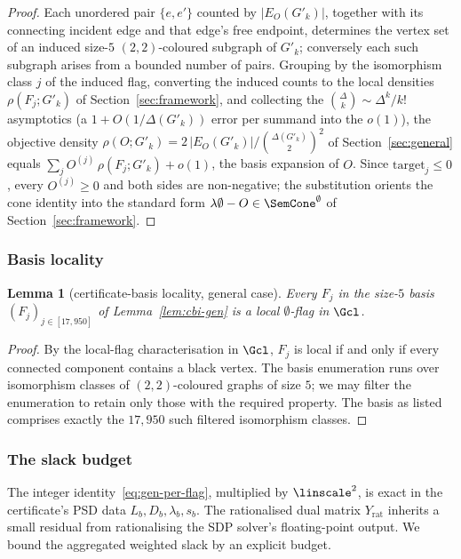\documentclass[11pt,a4paper]{article}
\newtheorem{lemma}[theorem]{Lemma}
\theoremstyle{definition}
\theoremstyle{remark}
\begin{document}
\begin{proof}
Each unordered pair $\{e, e'\}$ counted by $|E_O(G'_k)|$, together with
its connecting incident edge and that edge's free endpoint, determines
the vertex set of an induced size-$5$ $(2,2)$-coloured subgraph of
$G'_k$; conversely each such subgraph arises from a bounded number of
pairs. Grouping by the isomorphism class $j$ of the induced flag,
converting the induced counts to the local densities $\rho(F_j; G'_k)$
of Section~\ref{sec:framework}, and collecting the
$\binom{\Delta}{k} \sim \Delta^k/k!$ asymptotics (a $1 + O(1/\Delta(G'_k))$
error per summand into the $o(1)$), the objective density
$\rho(O; G'_k) = 2\,|E_O(G'_k)|/\binom{\Delta(G'_k)}{2}^2$ of
Section~\ref{sec:general} equals $\sum_j O^{(j)}\,\rho(F_j; G'_k) + o(1)$,
the basis expansion of $O$. Since $\mathrm{target}_j \leq 0$, every
$O^{(j)} \geq 0$ and both sides are non-negative; the substitution
orients the cone identity into the standard form
$\lambda\emptyset - O \in \SemCone^\emptyset$ of
Section~\ref{sec:framework}.
\end{proof}

\subsubsection{Basis locality}

\begin{lemma}[certificate-basis locality, general case]
\label{lem:basis-local-gen}
Every $F_j$ in the size-$5$ basis $(F_j)_{j \in [17{,}950]}$ of
Lemma~\ref{lem:cbi-gen} is a local $\emptyset$-flag in $\Gcl$.
\end{lemma}

\begin{proof}
By the local-flag characterisation in $\Gcl$, $F_j$ is local if and
only if every connected component contains a black vertex. The basis
enumeration runs over isomorphism classes of $(2,2)$-coloured graphs
of size $5$; we may filter the enumeration to retain only those
with the required property. The basis as listed comprises exactly
the $17{,}950$ such filtered isomorphism classes.
\end{proof}

\subsubsection{The slack budget}

The integer identity~\eqref{eq:gen-per-flag}, multiplied by
$\linscale^2$, is exact in the certificate's PSD data $L_b, D_b,
\lambda_b, s_b$. The rationalised dual matrix $Y_{\mathrm{rat}}$
inherits a small residual from rationalising the SDP solver's
floating-point output. We bound the aggregated weighted
slack by an explicit budget.
\end{document}
